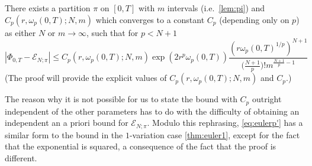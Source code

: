 \documentclass{article}
\def\cE{\mathcal{E}}
\numberwithin{equation}{section}
\theoremstyle{definition}
\theoremstyle{remark}
\begin{document}
\begin{theorem}\label{thm:eulerp}
There exists a partition $\pi$ on $[0,T]$ with $m$ intervals (i.e.\ \autoref{lem:pi}) and $C_p(r, \omega_p(0,T); N, m)$ which converges to a constant $C_p$ (depending only on $p$) as either $N$ or $m \to \infty$, such that for $p < N + 1$
\begin{equation}\label{eq:eulerp'}
	|\Phi_{0,T} - \mathcal E_{N;\pi}| \leq C_p(r, \omega_p(0,T); N, m) \exp(2r^p \omega_p(0,T))  \frac{(r \omega_p(0,T)^{1/p})^{N+1}}{\big(\frac{N+1}{p}\big)! m^{\frac{N+1}{p} - 1} } 
\end{equation}
(The proof will provide the explicit values of $C_p(r, \omega_p(0,T); N, m)$ and $C_p$.)
\end{theorem}
The reason why it is not possible for us to state the bound with $C_p$ outright independent of the other parameters has to do with the difficulty of obtaining an independent an a priori bound for $\cE_{N;\pi}$. Modulo this rephrasing, \eqref{eq:eulerp'} has a similar form to the bound in the $1$-variation case \autoref{thm:euler1}, except for the fact that the exponential is squared, a consequence of the fact that the proof is different.
\end{document}
